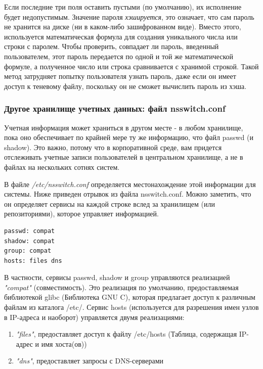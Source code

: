 \documentclass[10pt]{book}
\begin{document}
Если последние три поля оставить пустыми (по умолчанию), их исполнение будет недопустимым. Значение пароля \textit{хэшируется}, это означает, что сам пароль не хранится на диске (ни в каком-либо зашифрованном виде). Вместо этого, используется математическая формула для создания уникального числа или строки с паролем. Чтобы проверить, совпадает ли пароль, введенный пользователем, этот пароль передается по одной и той же математической формуле, а полученное число или строка сравнивается с хранимой строкой. Такой метод затрудняет попытку пользователя узнать пароль, даже если он имеет доступ к теневому файлу, поскольку он не сможет вычислить пароль из хэша.

\subsubsection{Другое хранилище учетных данных: файл nsswitch.conf}

Учетная информация может храниться в другом месте - в любом хранилище, пока оно обеспечивает по крайней мере ту же информацию, что файл passwd (и shadow). Это важно, потому что в корпоративной среде, вам придется отслеживать учетные записи пользователей в центральном хранилище, а не в файлах на нескольких сотнях систем.

В файле \textit{/etc/nsswitch.conf} определяется местонахождение этой информации для системы. Ниже приведен отрывок из файла nsswitch.conf. Можно заметить, что он определяет сервисы на каждой строке вслед за хранилищем (или репозиториями), которое управляет информацией.

\begin{tcolorbox}
\begin{lstlisting}
passwd: compat
shadow: compat
group: compat
hosts: files dns
\end{lstlisting}
\end{tcolorbox}

В частности, сервисы passwd, shadow и group управляются реализацией \textit{"compat"} (совместимость). Это реализация по умолчанию, предоставляемая библиотекой glibc (Библиотека GNU C), которая предлагает доступ к различным файлам из каталога /etc/. Сервис hosts (используется для разрешения имен узлов в IP-адреса и наоборот) управляется двумя реализациями:

\begin{enumerate}
  \item \textit{"files"}, предоставляет доступ к файлу /etc/hosts (Таблица, содержащая IP-адрес и имя хоста(ов))
  \item \textit{"dns"}, предоставляет запросы с DNS-серверами 
\end{enumerate}
\end{document}
